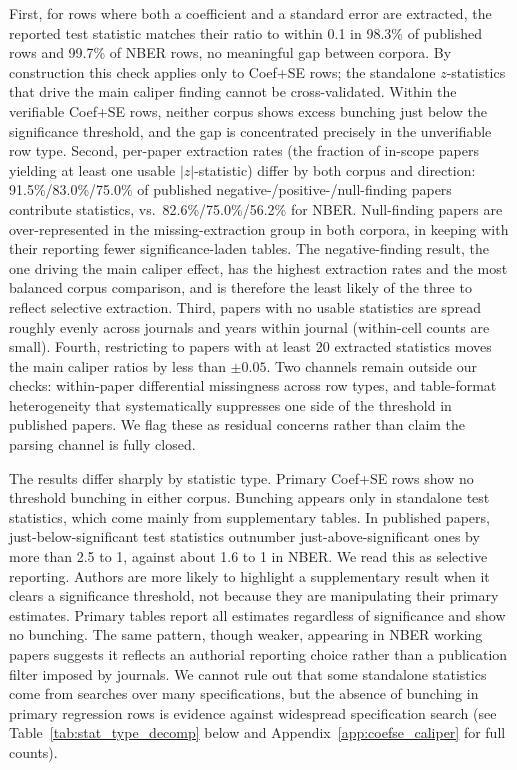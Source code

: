 \documentclass[12pt]{article}
\begin{document}
First, for rows where both a coefficient and a standard error are
extracted, the reported test statistic matches their ratio to within
0.1 in 98.3\% of published rows and 99.7\% of NBER rows, no meaningful
gap between corpora.  By construction this check applies only to
Coef+SE rows; the standalone $z$-statistics that drive the main
caliper finding cannot be cross-validated.  Within the verifiable
Coef+SE rows, neither corpus shows excess bunching just below the
significance threshold, and the gap is concentrated precisely in the
unverifiable row type.  Second, per-paper
extraction rates (the fraction of in-scope papers yielding at least one
usable $|z|$-statistic) differ by both corpus and direction:
91.5\%/83.0\%/75.0\% of published negative-/positive-/null-finding
papers contribute statistics, vs.\ 82.6\%/75.0\%/56.2\% for NBER.
Null-finding papers are over-represented in the missing-extraction
group in both corpora, in keeping with their reporting fewer
significance-laden tables.  The negative-finding result, the one
driving the main caliper effect, has the highest extraction rates and the most
balanced corpus comparison, and is therefore the least likely of the
three to reflect selective extraction.  Third, papers with no usable
statistics are spread roughly evenly across journals and years within
journal (within-cell counts are small).  Fourth, restricting to papers
with at least 20 extracted statistics moves the main caliper ratios by
less than $\pm 0.05$.  Two channels remain outside our checks:
within-paper differential missingness across row types, and
table-format heterogeneity that systematically suppresses one side of
the threshold in published papers.  We flag these as residual concerns
rather than claim the parsing channel is fully closed.

The results differ sharply by statistic type.  Primary Coef+SE rows
show no threshold bunching in either corpus.  Bunching appears only in standalone test statistics, which come
mainly from supplementary tables.  In published papers,
just-below-significant test statistics outnumber just-above-significant
ones by more than 2.5 to 1, against about 1.6 to 1 in NBER.
We read this as selective reporting.  Authors are more likely
to highlight a supplementary result when it clears a significance
threshold, not because they are manipulating their primary estimates.
Primary tables report all estimates regardless of significance and
show no bunching.  The same pattern, though weaker, appearing in
NBER working papers suggests
it reflects an authorial reporting choice rather than a publication filter
imposed by journals.  We cannot rule out that some standalone statistics
come from searches over many specifications, but the absence of bunching
in primary regression rows is evidence against widespread specification
search (see Table~\ref{tab:stat_type_decomp} below and
Appendix~\ref{app:coefse_caliper} for full counts).
\end{document}
